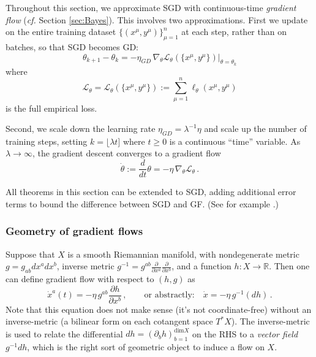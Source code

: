 \documentclass[11pt]{article}
\newcommand{\R}{\mathbb{R}}
\newcommand{\CL}{{\mathcal L}}
\begin{document}
Throughout this section, we approximate SGD with continuous-time \emph{gradient flow} (\emph{cf.} Section \ref{sec:Bayes}). This involves two approximations. First we update on the entire training dataset $\{(x^\mu,y^\mu)\}_{\mu=1}^n$ at each step, rather than on batches, so that SGD becomes GD:
%
\begin{equation}
    \theta_{k+1} - \theta_k = -  \eta_{GD}\, \nabla_\theta \CL_\theta(\{x^\mu,y^\mu\}) \big|_{\theta=\theta_k}
\end{equation}
%
where
%
\begin{equation} \CL_\theta = \CL_\theta(\{x^\mu,y^\mu\}) := \sum_{\mu=1}^n \ell_\theta(x^\mu,y^\mu) \label{ell} \end{equation}
%
is the full empirical loss.

Second, we scale down the learning rate $\eta_{GD}=\lambda^{-1}\eta$ and scale up the number of training steps, setting $k = \lfloor \lambda t]$ where $t\geq 0$ is a continuous ``time'' variable. As $\lambda\to\infty$, the gradient descent converges to a gradient flow
%
\begin{equation}
    \dot\theta := \frac{d}{dt} \theta = - \eta\, \nabla_\theta \CL_\theta\,.
\end{equation}

All theorems in this section can be extended to SGD, adding additional error terms to bound the difference between SGD and GF. (See for example \cite[Chapter 19]{spiliopoulos2025foundations}.)

\subsubsection{Geometry of gradient flows}
\label{sec:geom-grads}

Suppose that $X$ is a smooth Riemannian manifold, with nondegenerate metric $g = g_{ab}dx^a dx^b$, inverse metric $g^{-1} = g^{ab}\frac{\partial}{\partial x^a}\frac{\partial}{\partial x^b}$, and a function $h:X\to \R$. Then one can define gradient flow with respect to $(h,g)$ as
%
\begin{equation} \dot x^a(t) = -\eta\, g^{ab} \frac{\partial h}{\partial x^b}\,, \qquad \text{or abstractly:}\quad \dot x = -\eta\, g^{-1}(dh) \,. \label{GF} \end{equation}
%
Note that this equation does not make sense (it's not coordinate-free) without an inverse-metric (a bilinear form on each cotangent space $T^*X$). The inverse-metric is used to relate the differential $dh = (\partial_b h)_{b=1}^{\text{dim} X}$ on the RHS to a \emph{vector field} $g^{-1}dh$, which is the right sort of geometric object to induce a flow on $X$.
\end{document}
